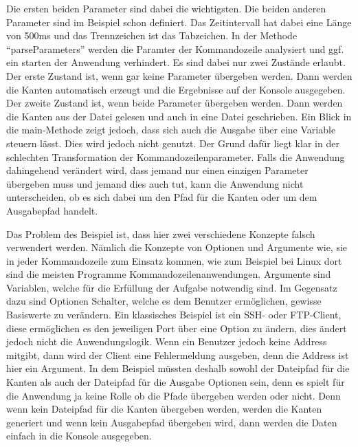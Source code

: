 Die ersten beiden Parameter sind dabei die wichtigsten. Die beiden anderen
Parameter sind im Beispiel schon definiert. Das Zeitintervall hat dabei eine
Länge von 500ms und das Trennzeichen ist das Tabzeichen. In der Methode
\enquote{parseParameters} werden die Paramter der Kommandozeile analysiert und
ggf. ein starten der Anwendung verhindert. Es sind dabei nur zwei Zustände
erlaubt. Der erste Zustand ist, wenn gar keine Parameter übergeben werden. Dann
werden die Kanten automatisch erzeugt und die Ergebnisse auf der Konsole
ausgegeben. Der zweite Zustand ist, wenn beide Parameter übergeben werden. Dann
werden die Kanten aus der Datei gelesen und auch in eine Datei geschrieben. Ein
Blick in die main-Methode zeigt jedoch, dass sich auch die Ausgabe über eine
Variable steuern lässt. Dies wird jedoch nicht genutzt. Der Grund dafür liegt
klar in der schlechten Transformation der Kommandozeilenparameter. Falls die
Anwendung dahingehend verändert wird, dass jemand nur einen einzigen Parameter
übergeben muss und jemand dies auch tut, kann die Anwendung nicht unterscheiden,
ob es sich dabei um den Pfad für die Kanten oder um dem Ausgabepfad handelt.

Das Problem des Beispiel ist, dass hier zwei verschiedene Konzepte falsch
verwendert werden. Nämlich die Konzepte von Optionen und Argumente wie, sie in
jeder Kommandozeile zum Einsatz kommen, wie zum Beispiel bei Linux dort sind die
meisten Programme Kommandozeilenanwendungen. Argumente sind Variablen, welche für
die Erfüllung der Aufgabe notwendig sind. Im Gegensatz dazu sind Optionen
Schalter, welche es dem Benutzer ermöglichen, gewisse Basiswerte zu verändern.
Ein klassisches Beispiel ist ein SSH- oder FTP-Client, diese ermöglichen es den
jeweiligen Port über eine Option zu ändern, dies ändert jedoch nicht die
Anwendungslogik. Wenn ein Benutzer jedoch keine Address mitgibt, dann wird der
Client eine Fehlermeldung ausgeben, denn die Address ist hier ein Argument. In
dem Beispiel müssten deshalb sowohl der Dateipfad für die Kanten als auch der
Dateipfad für die Ausgabe Optionen sein, denn es spielt für die Anwendung ja
keine Rolle ob die Pfade übergeben werden oder nicht. Denn wenn kein Dateipfad
für die Kanten übergeben werden, werden die Kanten generiert und wenn kein
Ausgabepfad übergeben wird, dann werden die Daten einfach in die Konsole
ausgegeben.

